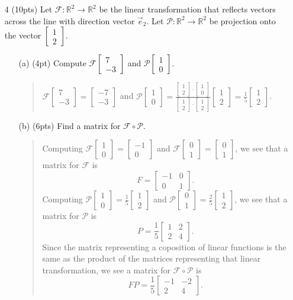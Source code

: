 \documentclass{article}
\newcommand{\R}{\mathbb{R}}
\newcommand{\mat}[1]{\begin{bmatrix}#1\end{bmatrix}}
\begin{document}
\begin{enumerate}
	\item[4 (10pts)] Let $\mathcal F:\R^2\to\R^2$ be the linear transformation that reflects
		vectors across the line with direction vector $\vec e_2$.  
		Let $\mathcal P:\R^2\to\R^2$ be projection
		onto the vector $\mat{1\\2}$.
	\begin{enumerate}
		\item[(a) (4pt)] Compute $\mathcal F\mat{7\\-3}$ and $\mathcal P\mat{1\\0}$.
			\begin{quote}
				$\mathcal F\mat{7\\-3}=\mat{-7\\-3}$ and $\mathcal P\mat{1\\0}=
				\frac{\mat{1\\2}\cdot\mat{1\\0}}{\mat{1\\2}\cdot\mat{1\\2}}\mat{1\\2}=\frac{1}{5}\mat{1\\2}$.
			\end{quote}

		\vspace{1in}

		\item[(b) (6pts)] Find a matrix for $\mathcal F\circ \mathcal P$.
			\begin{quote}
				Computing $\mathcal F\mat{1\\0}=\mat{-1\\0}$ and $\mathcal F\mat{0\\1}=\mat{0\\1}$,
				we see that a matrix for $\mathcal F$ is 
				\[
					F=\mat{-1&0\\0&1}.
				\]
				Computing $\mathcal P\mat{1\\0}=\frac{1}{5}\mat{1\\2}$ and $\mathcal P\mat{0\\1}=\frac{2}{5}\mat{1\\2}$,
				we see that a matrix for $\mathcal P$ is 
				\[
					P=\frac{1}{5}\mat{1&2\\2&4}.
				\]
				Since the matrix representing a coposition of linear functions is the same as the product
				of the matrices representing that linear transformation, we see a matrix for $\mathcal F\circ \mathcal P$
				is
				\[
					FP=\frac{1}{5}\mat{-1&-2\\2&4}.
				\]
			\end{quote}
			\vspace{5in}
	\end{enumerate}
	\clearpage


\end{enumerate}
\end{document}

